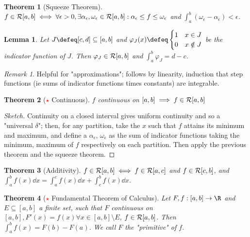 \documentclass[12pt, oneside]{article}
\theoremstyle{definition}
\theoremstyle{plain}
\newtheorem{thm}{Theorem}
\newtheorem{lemma}{Lemma}
\theoremstyle{remark}
\newtheorem{remark}{Remark}
\begin{document}
\begin{thm}[Squeeze Theorem]
  $f \in \mathcal{R}[a, b] \iff \forall \epsilon > 0, \exists \alpha_\epsilon, \omega_\epsilon \in \mathcal{R}[a,b] : \alpha_\epsilon \leq f \leq \omega_\epsilon$ and $\int_a^b (\omega_\epsilon - \alpha_\epsilon) < \epsilon$.
\end{thm}

\begin{lemma}
  Let $J \defeq [c, d] \subseteq [a, b]$ and $\varphi_J(x) \defeq \begin{cases}
    1 & x \in J\\
    0 & x \notin J
  \end{cases}$ be the indicator function of $J$. Then $\varphi_J \in \mathcal{R}[a, b]$ and $\int_a^b \varphi_J = d- c$.
\end{lemma}

\begin{remark}
  Helpful for "approximations"; follows by linearity, induction that step functions (ie sums of indicator functions times constants) are integrable.
\end{remark}

\begin{thm}[\textcolor{red}{$\star$} Continuous]
  $f$ continuous on $[a, b] \implies f \in \mathcal{R}[a, b]$
\end{thm}

\begin{proof}[Sketch]
  Continuity on a closed interval gives uniform continuity and so a "universal $\delta$"; then, for any partition, take the $x$ such that $f$ attains its minimum and maximum, and define a $\alpha_\epsilon$, $\omega_\epsilon$ as the sum of indicator functions taking the minimum, maximum of $f$ respectively on each partition. Then apply the previous theorem and the squeeze theorem.
\end{proof}

\begin{thm}[Additivity]
  $f \in \mathcal{R}[a, b] \iff f \in \mathcal{R}[a, c]$ and $f \in \mathcal{R}[c, b]$, and $\int_a^b f(x) \dd{x} = \int_a^c f(x) \dd{x} + \int_c^b f(x) \dd{x}$.
\end{thm}

\begin{thm}[\textcolor{red}{$\star$} Fundamental Theorem of Calculus]
  Let $F, f : [a, b] \to \R$ and $E \subseteq [a, b]$ a finite set, such that $F$ continuous on $[a, b], F'(x) = f(x) \forall x \in [a, b] \setminus E$, $f \in \mathcal{R}[a, b]$. Then $\int_a^b f(x) = F(b) - F(a)$. We call $F$ the "primitive" of $f$.
\end{thm}
\end{document}
